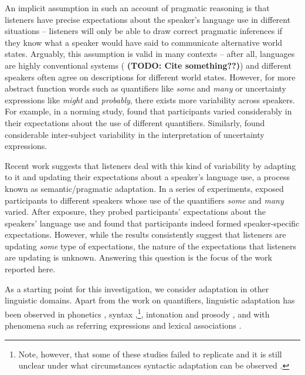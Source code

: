 \documentclass[lucida,biblatex]{sp} %
\newcommand{\todo}[1]{}
\renewcommand{\todo}[1]{{\bf \color{red} (TODO: {#1})}}
\begin{document}
An implicit assumption in such an account of pragmatic reasoning is that listeners have precise expectations about the speaker's language use in different situations -- listeners will only be able to draw correct pragmatic inferences if they know what a speaker would have said to communicate alternative world states. Arguably, this assumption is valid in many contexts -- after all, languages are highly conventional systems (\todo{Cite something??}) and different speakers  often agree on descriptions for different world states. However, for more abstract function words such as quantifiers like \textit{some} and \textit{many} or uncertainty expressions like \textit{might} and \textit{probably}, there exists more variability across speakers. For example, in a norming study, \citet{Yildirim2016} found that participants varied considerably in their expectations about the use of different quantifiers. Similarly, \citet{Wallsten1986} found considerable inter-subject variability in the interpretation of uncertainty expressions. 

Recent work suggests that listeners deal with this kind of variability by adapting to it and updating their expectations about a speaker's language use, a process known as semantic/pragmatic adaptation. In a series of experiments, \citet{Yildirim2016} exposed participants to different speakers whose use of the quantifiers \textit{some} and \textit{many} varied. After exposure, they probed participants' expectations about the speakers' language use and found that participants indeed formed speaker-specific expectations. However, while the results consistently suggest that listeners are updating \textit{some} type of expectations, the nature of the expectations that listeners are updating is unknown. Answering this question is the focus of the work reported here.

As a starting point for this investigation, we consider adaptation in other linguistic domains. Apart from the work on quantifiers, linguistic adaptation has been observed in  phonetics \citep[e.g.,][]{Goldinger1998,Norris2003,Kraljic2005,Kraljic2007,Babel2012,Kleinschmidt2015}, 
syntax \citep{Kamide2012,Fine2013,Fine2016,Myslin2016,Kroczek2017},\footnote{Note, 
however, that some of these studies failed to replicate and it is still unclear under what 
circumstances syntactic adaptation can be observed \citep[see ][]{Liu2017,HarringtonStack2018}.}, intonation and prosody \citep{Kurumada2012,Roettger2019}, and with phenomena such as referring expressions
\citep{Clark1986,Brennan1996,Metzing2003,Horton2005,Brennan2009} and lexical associations \citep{DelaneyBusch2019}. 
\end{document}
